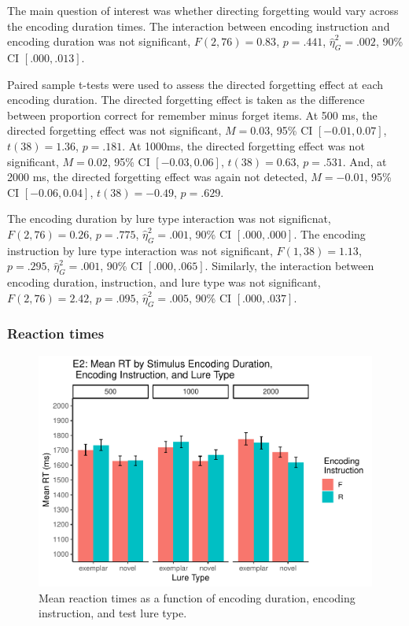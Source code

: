 \documentclass[
  english,
  man,floatsintext]{apa6}
\begin{document}
The main question of interest was whether directing forgetting would vary across the encoding duration times. The interaction between encoding instruction and encoding duration was not significant, \(F(2, 76) = 0.83\), \(p = .441\), \(\hat{\eta}^2_G = .002\), 90\% CI \([.000, .013]\).

Paired sample t-tests were used to assess the directed forgetting effect at each encoding duration. The directed forgetting effect is taken as the difference between proportion correct for remember minus forget items. At 500 ms, the directed forgetting effect was not significant, \(M = 0.03\), 95\% CI \([-0.01, 0.07]\), \(t(38) = 1.36\), \(p = .181\). At 1000ms, the directed forgetting effect was not significant, \(M = 0.02\), 95\% CI \([-0.03, 0.06]\), \(t(38) = 0.63\), \(p = .531\). And, at 2000 ms, the directed forgetting effect was again not detected, \(M = -0.01\), 95\% CI \([-0.06, 0.04]\), \(t(38) = -0.49\), \(p = .629\).

The encoding duration by lure type interaction was not significnat, \(F(2, 76) = 0.26\), \(p = .775\), \(\hat{\eta}^2_G = .001\), 90\% CI \([.000, .000]\). The encoding instruction by lure type interaction was not significant, \(F(1, 38) = 1.13\), \(p = .295\), \(\hat{\eta}^2_G = .001\), 90\% CI \([.000, .065]\). Similarly, the interaction between encoding duration, instruction, and lure type was not significant, \(F(2, 76) = 2.42\), \(p = .095\), \(\hat{\eta}^2_G = .005\), 90\% CI \([.000, .037]\).

\hypertarget{reaction-times-1}{%
\subsubsection{Reaction times}\label{reaction-times-1}}

\begin{figure}
\centering
\includegraphics{honorsThesis_NEW_files/figure-latex/E2fig2-1.pdf}
\caption{\label{fig:E2fig2}Mean reaction times as a function of encoding duration, encoding instruction, and test lure type.}
\end{figure}
\end{document}
